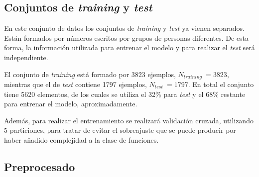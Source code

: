 \documentclass[a4paper, 20pt]{article}
\newcommand{\training}{\textit{training }}
\newcommand{\test}{\textit{test }}
\begin{document}
{%
\subsection{Conjuntos de \textit{training} y \textit{test}}

En este conjunto de datos los conjuntos de \training y \test ya vienen separados. Están formados por números escritos por grupos de personas diferentes. De esta forma, la información utilizada para entrenar el modelo y para realizar el \test será independiente.

El conjunto de \training está formado por 3823 ejemplos, $N_{\training} = 3823$, mientras que el de \test contiene 1797 ejemplos, $N_{\test} = 1797$. En total el conjunto tiene 5620 elementos, de los cuales se utiliza el 32\% para \test y el 68\% restante para entrenar el modelo, aproximadamente.

Además, para realizar el entrenamiento se realizará validación cruzada, utilizando 5 particiones, para tratar de evitar el sobreajuste que se puede producir por haber añadido complejidad a la clase de funciones.

\subsection{Preprocesado}

}
\end{document}

